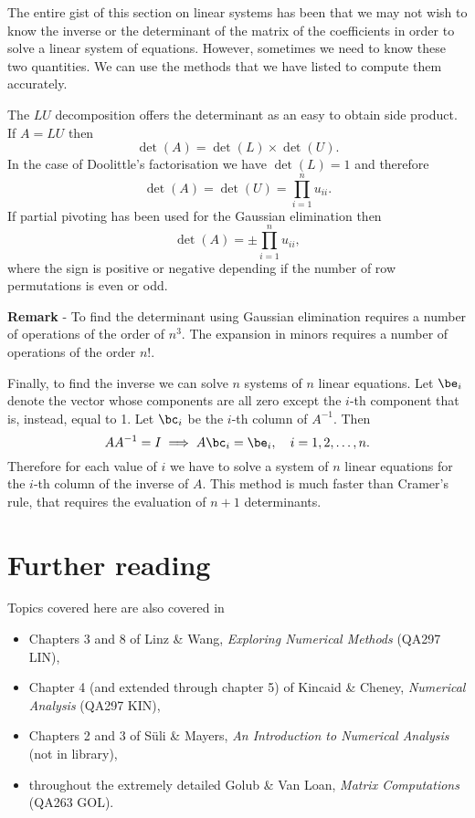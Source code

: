 The entire gist of this section on linear systems has been that we may
not wish to know the inverse or the determinant of the matrix of the
coefficients in order to solve a linear system of equations.
However, sometimes we need to know these two quantities.  We can use
the methods that we have listed to compute them accurately.

The $LU$ decomposition offers the determinant as an easy to obtain side
product.  If $A = L U$ then
%
\begin{equation*}
  \det(A) = \det(L) \times \det(U).
\end{equation*}
%
In the case of Doolittle's factorisation we have $\det(L) = 1$ and
therefore
%
\begin{equation*}
\det(A) = \det(U) = \prod_{i=1}^n u_{i i} .
\end{equation*}
%
If partial pivoting has been used for the Gaussian elimination then
%
\begin{equation*}
  \det(A) = \pm \prod_{i=1}^n u_{i i} ,
\end{equation*}
%
where the sign is positive or negative depending if the number of row
permutations is even or odd.

\noindent
\textbf{Remark} - To find the determinant using Gaussian elimination
requires a number of operations of the order of $n^3$.   The expansion
in minors requires a number of operations of the order $n!$.

\medskip

Finally, to find the inverse we can solve $n$ systems of $n$ linear
equations.  Let $\be_i$ denote the vector whose components are all
zero except the $i$-th component that is, instead, equal to 1.   Let
$\bc_i$ be the $i$-th column of $A^{-1}$.   Then
%
\begin{equation*}
  A A^{-1} = I \implies A \bc_i = \be_i , \quad i=1,2,\ldots,n.
\end{equation*}
%
Therefore for each value of $i$ we have to solve a system of $n$
linear equations for the $i$-th column of the inverse of $A$.   This
method is much faster than Cramer's rule, that requires the evaluation
of $n+1$ determinants.

\section*{Further reading}

Topics covered here are also covered in
\begin{itemize}
\item Chapters 3 and 8 of Linz \& Wang, \textit{Exploring Numerical
    Methods} (QA297 LIN),
\item Chapter 4 (and extended through chapter 5) of Kincaid \& Cheney,
  \textit{Numerical Analysis} (QA297 KIN),
\item Chapters 2 and 3 of S{\"u}li \& Mayers, \textit{An Introduction
    to Numerical Analysis} (not in library),
\item throughout the extremely detailed Golub \& Van Loan,
  \textit{Matrix Computations} (QA263 GOL).
\end{itemize}
